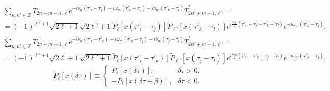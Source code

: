 \documentclass[a4paper,12pt]{article}
\renewcommand{\t}{\ensuremath{\tau}}
\newcommand{\w}{\ensuremath{\omega}}
\begin{document}
\begin{multline}
	\sum_{n,n'\in\mathbb{Z}}
	\bar T_{2n+m+1,\ell}
	e^{-i\nu_n(\t'_i-\t_j) -i\w_m(\t'_k-\t_j) -i\nu_{n'}(\t'_k-\t_l)}
	\bar T^*_{2n'+m+1,\ell'} =\\=
	(-1)^{\ell'+1}\sqrt{2\ell+1}\sqrt{2\ell'+1}
	\tilde P_\ell[x(\t'_i-\t_j)] \tilde P_{\ell'}[x(\t'_k-\t_l)]
	e^{i\frac{\w_m}{2}(\t'_i-\t_j+\t'_k-\t_l)} e^{-i\w_m(\t'_k-\t_j)},
\end{multline}
\begin{multline}
	\sum_{n,n'\in\mathbb{Z}}
	\bar T_{2n+m+1,\ell}
	e^{-i\nu_n(\t'_i-\t'_k) -i\w_m(\t'_k-\t_j) -i\nu_{n'}(\t_j-\t_l)}
	\bar T^*_{2n'+m+1,\ell'} =\\=
	(-1)^{\ell'+1}\sqrt{2\ell+1}\sqrt{2\ell'+1}
	\tilde P_\ell[x(\t'_i-\t'_k)] \tilde P_{\ell'}[x(\t_j-\t_l)]
	e^{i\frac{\w_m}{2}(\t'_i-\t'_k+\t_j-\t_l)} e^{-i\w_m(\t'_k-\t_j)},
\end{multline}
\begin{equation}
	\tilde P_\ell[x(\delta\t)] \equiv \left\{
	\begin{array}{ll}
	P_\ell[x(\delta\t)], &\delta\t>0,\\
	-P_\ell[x(\delta\t+\beta)], &\delta\t<0.
	\end{array}
	\right.
\end{equation}
\end{document}
